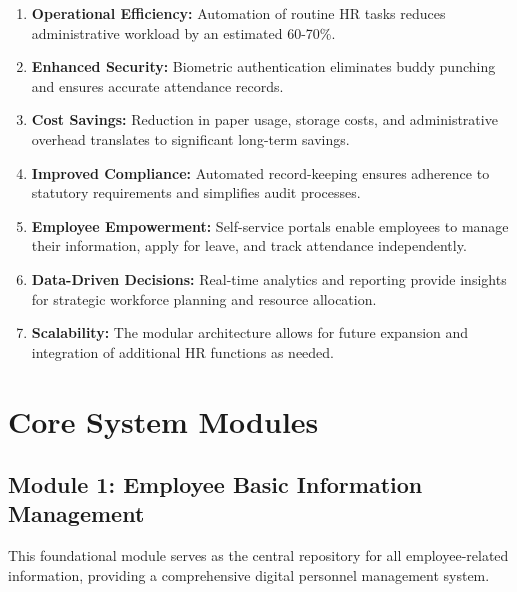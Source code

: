 \documentclass[12pt]{article}
\begin{document}
\begin{enumerate}[noitemsep]
\item \textbf{Operational Efficiency:} Automation of routine HR tasks reduces administrative workload by an estimated 60-70\%.
\item \textbf{Enhanced Security:} Biometric authentication eliminates buddy punching and ensures accurate attendance records.
\item \textbf{Cost Savings:} Reduction in paper usage, storage costs, and administrative overhead translates to significant long-term savings.
\item \textbf{Improved Compliance:} Automated record-keeping ensures adherence to statutory requirements and simplifies audit processes.
\item \textbf{Employee Empowerment:} Self-service portals enable employees to manage their information, apply for leave, and track attendance independently.
\item \textbf{Data-Driven Decisions:} Real-time analytics and reporting provide insights for strategic workforce planning and resource allocation.
\item \textbf{Scalability:} The modular architecture allows for future expansion and integration of additional HR functions as needed.
\end{enumerate}

\section{Core System Modules}

\subsection{Module 1: Employee Basic Information Management}

This foundational module serves as the central repository for all employee-related information, providing a comprehensive digital personnel management system.
\end{document}
